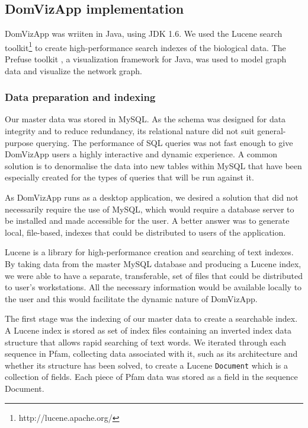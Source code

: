 
\subsection{DomVizApp implementation}
DomVizApp was wriiten in Java, using JDK 1.6. We used the Lucene search toolkit\footnote{http://lucene.apache.org/} to create high-performance search indexes of the biological data. The Prefuse toolkit \cite{prefuse}, a visualization framework for Java, was used to model graph data and visualize the network graph.

\subsubsection{Data preparation and indexing}
Our master data was stored in MySQL. As the schema was designed for data integrity and to reduce redundancy, its relational nature did not suit general-purpose querying. The performance of SQL queries was not fast enough to give DomVizApp users a highly interactive and dynamic experience. A common solution is to denormalise the data into new tables within MySQL that have been especially created for the types of queries that will be run against it.

As DomVizApp runs as a desktop application, we desired a solution that did not necessarily require the use of MySQL, which would require a database server to be installed and made accessible for the user. A better answer was to generate local, file-based, indexes that could be distributed to users of the application.

Lucene is a library for high-performance creation and searching of text indexes. By taking data from the master MySQL database and producing a Lucene index, we were able to have a separate, transferable, set of files that could be distributed to user's workstations. All the necessary information would be available locally to the user and this would facilitate the dynamic nature of DomVizApp.

The first stage was the indexing of our master data to create a searchable index. A Lucene index is stored as set of index files containing an inverted index data structure that allows rapid searching of text words. We iterated through each sequence in Pfam, collecting data associated with it, such as its architecture and whether its structure has been solved, to create a Lucene \texttt{Document} which is a collection of fields. Each piece of Pfam data was stored as a field in the sequence Document.

